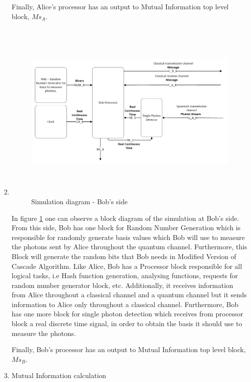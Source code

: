\begin{enumerate}
    Finally, Alice's processor has an output to Mutual Information top level block, $Ms_{A}$.


  \item

  \begin{figure}[h]
	\centering
	\includegraphics[width=1.1\textwidth, height=9cm]{./sdf/qokd_with_discrete_variables/figures/Simulation_Bob.png}
	\caption{Simulation diagram - Bob's side}\label{simulationbob}
\end{figure}

    In figure \ref{simulationbob} one can observe a block diagram of the simulation at Bob's side. From this side, Bob has one block for Random Number Generation which is responsible for randomly generate basis values which Bob will use to measure the photons sent by Alice throughout the quantum channel. Furthermore, this Block will generate the random bits that Bob needs in Modified Version of Cascade Algorithm. Like Alice, Bob has a Processor block responsible for all logical tasks, i.e Hash function generation, analysing functions, requests for random number generator block, etc. Additionally, it receives information from Alice throughout a classical channel and a quantum channel but it sends information to Alice only throughout a classical channel. Furthermore, Bob has one more block for single photon detection which receives from processor block a real discrete time signal, in order to obtain the basis it should use to measure the photons.

    Finally, Bob's processor has an output to Mutual Information top level block, $Ms_{B}$.

  \item Mutual Information calculation

\end{enumerate}



